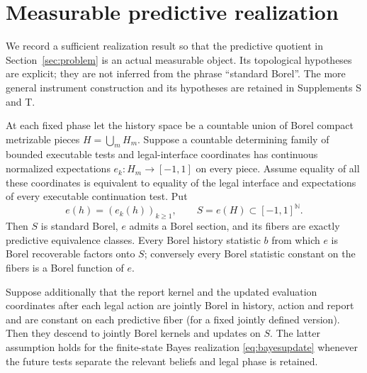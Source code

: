 \section{Measurable predictive realization}\label{sec:quotient}
We record a sufficient realization result so that the predictive quotient in Section~\ref{sec:problem} is an actual measurable object. Its topological hypotheses are explicit; they are not inferred from the phrase ``standard Borel''. The more general instrument construction and its hypotheses are retained in Supplements S and T.

\begin{proposition}\label{prop:quotient}
At each fixed phase let the history space be a countable union of Borel compact metrizable pieces $H=\bigcup_m H_m$. Suppose a countable determining family of bounded executable tests and legal-interface coordinates has continuous normalized expectations $e_k:H_m\to[-1,1]$ on every piece. Assume equality of all these coordinates is equivalent to equality of the legal interface and expectations of every executable continuation test. Put
\[
 e(h)=(e_k(h))_{k\ge1},\qquad S=e(H)\subset[-1,1]^{\mathbb N}.
\]
Then $S$ is standard Borel, $e$ admits a Borel section, and its fibers are exactly predictive equivalence classes. Every Borel history statistic $b$ from which $e$ is Borel recoverable factors onto $S$; conversely every Borel statistic constant on the fibers is a Borel function of $e$.

Suppose additionally that the report kernel and the updated evaluation coordinates after each legal action are jointly Borel in history, action and report and are constant on each predictive fiber (for a fixed jointly defined version). Then they descend to jointly Borel kernels and updates on $S$. The latter assumption holds for the finite-state Bayes realization \eqref{eq:bayesupdate} whenever the future tests separate the relevant beliefs and legal phase is retained.
\end{proposition}
